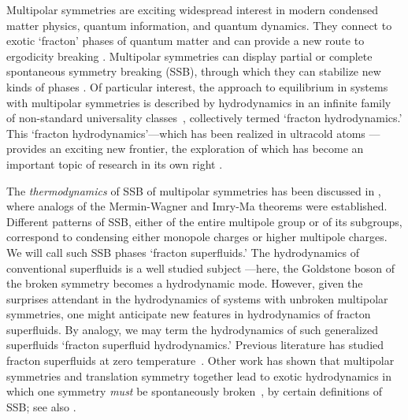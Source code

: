 Multipolar symmetries are exciting widespread interest in modern condensed matter physics, quantum information, and quantum dynamics. They connect to exotic `fracton' phases of quantum matter \cite{Pretko2017Subdimensional, Gromov2019Multipole} and can provide a new route to ergodicity breaking \cite{Pai2019Localization, Khemani2020Localization, Sala2020Fragmentation}. Multipolar symmetries can display partial or complete spontaneous symmetry breaking (SSB), through which they can stabilize new kinds of phases \cite{Lake2022Dipolar}. Of particular interest, the approach to equilibrium in systems with multipolar symmetries is described by hydrodynamics in an infinite family of non-standard universality classes~\cite{Gromov2020Fracton, Iaconis2019Subdiffusion}, collectively termed `fracton hydrodynamics.' This `fracton hydrodynamics'---which has been realized in ultracold atoms \cite{GuardadoSanchez2020}---provides an exciting new frontier, the exploration of which has become an important topic of research in its own right \cite{Glorioso2022Breakdown, RichterPal2022, Iaconis2021Multipole, Glorioso2021Nonabelian, Grosvenor2021Hydrodynamics, Osborne2021FractonFluids, Feldmeier2020Anomalous, Sala2022Modulated, Hart2022Quasiconservation, Qi2023FractonMHD, Guo2022Fracton, Glorioso2023Goldstone}. 

The {\it thermodynamics} of SSB of multipolar symmetries has been discussed in \cite{Stahl2022Spontaneous, Kapustin2022Hohenberg}, where analogs of the Mermin-Wagner and Imry-Ma theorems were established. Different patterns of SSB, either of the entire multipole group or of its subgroups, correspond to condensing either monopole charges or higher multipole charges. We will call such SSB phases `fracton superfluids.'
The hydrodynamics of conventional superfluids is a well studied subject \cite{Putterman1974SF}---here, the Goldstone boson of the broken symmetry becomes a hydrodynamic mode. However, given the surprises attendant in the  hydrodynamics of systems with unbroken multipolar symmetries, one might anticipate new features in hydrodynamics of fracton superfluids. By analogy, we may term the hydrodynamics of such generalized superfluids `fracton superfluid hydrodynamics.' Previous literature has studied fracton superfluids at zero temperature~\cite{Yuan2020Fractonic, Lake2022Dipolar}. 
Other work has shown that multipolar symmetries and translation symmetry together lead to exotic hydrodynamics in which one symmetry \emph{must} be spontaneously broken~\cite{Glorioso2023Goldstone}, by certain definitions of SSB; see also \cite{Jensen2022Large}. 

